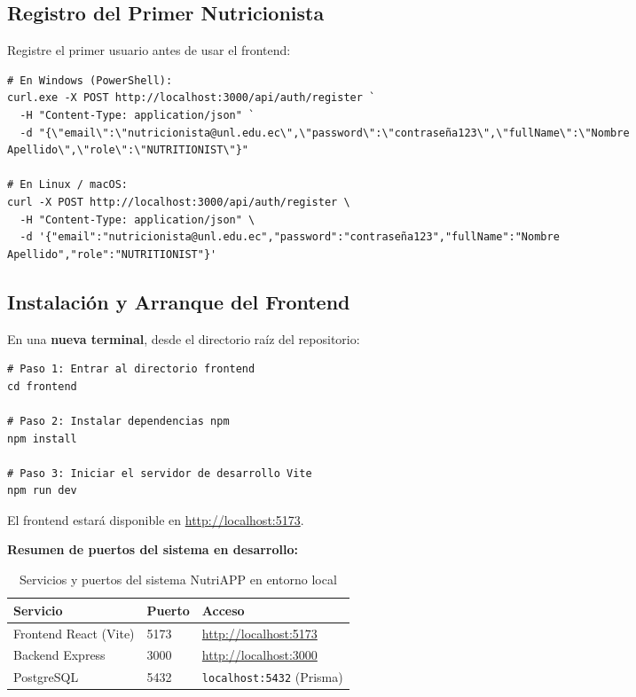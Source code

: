 \documentclass[12pt,a4paper]{article}
\begin{document}
\subsection{Registro del Primer Nutricionista}

Registre el primer usuario antes de usar el frontend:

\begin{lstlisting}[style=shell,caption={Registrar nutricionista via POST /api/auth/register}]
# En Windows (PowerShell):
curl.exe -X POST http://localhost:3000/api/auth/register `
  -H "Content-Type: application/json" `
  -d "{\"email\":\"nutricionista@unl.edu.ec\",\"password\":\"contraseña123\",\"fullName\":\"Nombre Apellido\",\"role\":\"NUTRITIONIST\"}"

# En Linux / macOS:
curl -X POST http://localhost:3000/api/auth/register \
  -H "Content-Type: application/json" \
  -d '{"email":"nutricionista@unl.edu.ec","password":"contraseña123","fullName":"Nombre Apellido","role":"NUTRITIONIST"}'
\end{lstlisting}

\subsection{Instalación y Arranque del Frontend}

En una \textbf{nueva terminal}, desde el directorio raíz del repositorio:

\begin{lstlisting}[style=shell,caption={Instalacion y arranque del frontend React}]
# Paso 1: Entrar al directorio frontend
cd frontend

# Paso 2: Instalar dependencias npm
npm install

# Paso 3: Iniciar el servidor de desarrollo Vite
npm run dev
\end{lstlisting}

El frontend estará disponible en \url{http://localhost:5173}.

\textbf{Resumen de puertos del sistema en desarrollo:}

\begin{table}[H]
\centering
\caption{Servicios y puertos del sistema NutriAPP en entorno local}
\label{tab:puertos}
\begin{tabular}{|l|l|l|}
\hline
\textbf{Servicio} & \textbf{Puerto} & \textbf{Acceso} \\
\hline
Frontend React (Vite)  & 5173 & \url{http://localhost:5173} \\
\hline
Backend Express        & 3000 & \url{http://localhost:3000} \\
\hline
PostgreSQL             & 5432 & \texttt{localhost:5432} (Prisma) \\
\hline
\end{tabular}
\end{table}
\end{document}
